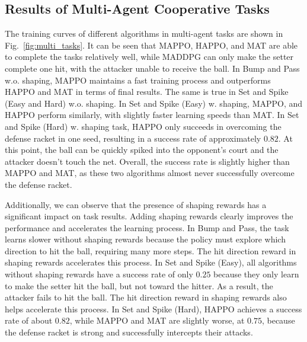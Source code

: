 \subsection{Results of Multi-Agent Cooperative Tasks}
\label{app:multi}
The training curves of different algorithms in multi-agent tasks are shown in Fig.~\ref{fig:multi_tasks}. It can be seen that MAPPO, HAPPO, and MAT are able to complete the tasks relatively well, while MADDPG can only make the setter complete one hit, with the attacker unable to receive the ball. In Bump and Pass w.o. shaping, MAPPO maintains a fast training process and outperforms HAPPO and MAT in terms of final results. The same is true in Set and Spike (Easy and Hard) w.o. shaping. In Set and Spike (Easy) w. shaping, MAPPO, and HAPPO perform similarly, with slightly faster learning speeds than MAT. In Set and Spike (Hard) w. shaping task, HAPPO only succeeds in overcoming the defense racket in one seed, resulting in a success rate of approximately $0.82$. At this point, the ball can be quickly spiked into the opponent's court and the attacker doesn't touch the net. Overall, the success rate is slightly higher than MAPPO and MAT, as these two algorithms almost never successfully overcome the defense racket.

Additionally, we can observe that the presence of shaping rewards has a significant impact on task results. Adding shaping rewards clearly improves the performance and accelerates the learning process. In Bump and Pass, the task learns slower without shaping rewards because the policy must explore which direction to hit the ball, requiring many more steps. The hit direction reward in shaping rewards accelerates this process. In Set and Spike (Easy), all algorithms without shaping rewards have a success rate of only $0.25$ because they only learn to make the setter hit the ball, but not toward the hitter. As a result, the attacker fails to hit the ball. The hit direction reward in shaping rewards also helps accelerate this process. In Set and Spike (Hard), HAPPO achieves a success rate of about $0.82$, while MAPPO and MAT are slightly worse, at $0.75$, because the defense racket is strong and successfully intercepts their attacks.


